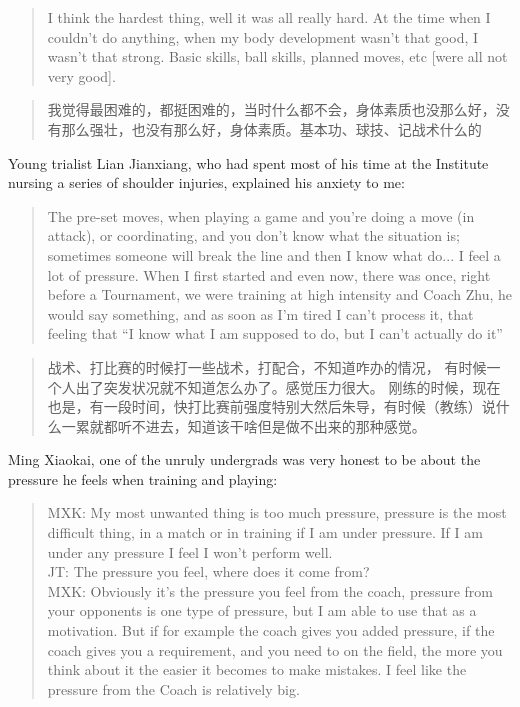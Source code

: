 \begin{CJK}{UTF8}{gbsn}
\begin{quotation}
    I think the hardest thing, well it was all really hard.  At the time when I couldn't do anything, when my body development wasn't that good, I wasn't that strong.  Basic skills, ball skills, planned moves, etc [were all not very good].
\end{quotation}

\begin{quotation}
    我觉得最困难的，都挺困难的，当时什么都不会，身体素质也没那么好，没有那么强壮，也没有那么好，身体素质。基本功、球技、记战术什么的 
\end{quotation}

Young trialist Lian Jianxiang, who had spent most of his time at the Institute nursing a series of shoulder injuries, explained his anxiety to me:

    \begin{quotation}
      The pre-set moves, when playing a game and you’re doing a move (in attack), or coordinating, and you don’t know what the situation is; sometimes someone will break the line and then I know what do... I feel a lot of pressure.  When I first started and even now, there was once, right before a Tournament, we were training at high intensity and Coach Zhu, he would say something, and as soon as I'm tired I can't process it, that feeling that ``I know what I am supposed to do, but I can't actually do it''
    \end{quotation}

    \begin{quotation}
      战术、打比赛的时候打一些战术，打配合，不知道咋办的情况， 有时候一个人出了突发状况就不知道怎么办了。感觉压力很大。 刚练的时候，现在也是，有一段时间，快打比赛前强度特别大然后朱导，有时候（教练）说什么一累就都听不进去，知道该干啥但是做不出来的那种感觉。
    \end{quotation}

Ming Xiaokai, one of the unruly undergrads was very honest to be about the pressure he feels when training and playing:

    \begin{quotation}
      MXK: My most unwanted thing is too much pressure, pressure is the most difficult thing, in a match or in training if I am under pressure.  If I am under any pressure I feel I won’t perform well. \\
      JT: The pressure you feel, where does it come from? \\
      MXK: Obviously it's the pressure you feel from the coach, pressure from your opponents is one type of pressure, but I am able to use that as a motivation. But if for example the coach gives you added pressure, if the coach gives you a requirement, and you need to on the field, the more you think about it the easier it becomes to make mistakes.  I feel like the pressure from the Coach is relatively big.
    \end{quotation}


\end{CJK}

